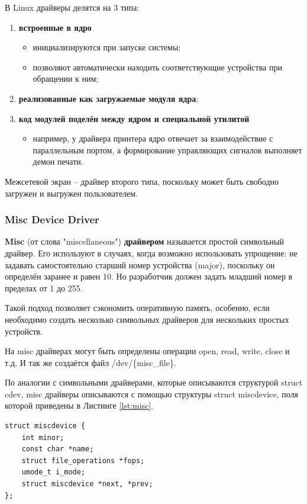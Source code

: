 В Linux драйверы делятся на 3 типа:
\begin{enumerate}
	\item \textbf{встроенные в ядро}
	\begin{itemize}
		\item инициализируются при запуске системы;
		
		\item позволяют автоматически находить соответствующие устройства при обращении к ним;
	\end{itemize}
	
	\item \textbf{реализованные как загружаемые модуля ядра};
	
	\item \textbf{код модулей поделён между ядром и специальной утилитой}
	\begin{itemize}
		\item например, у драйвера принтера ядро отвечает за взаимодействие с параллельным портом, а формирование управляющих сигналов выполняет демон печати.
	\end{itemize}
\end{enumerate}

Межсетевой экран -- драйвер второго типа, поскольку может быть свободно загружен и выгружен пользователем. \newline

\subsubsection{Misc Device Driver}
\textbf{Misc} (от слова "miscellaneous") \textbf{драйвером} называется простой символьный драйвер. Его используют в случаях, когда возможно использовать упрощение: не задавать самостоятельно старший номер устройства (major), поскольку он определён заранее и равен 10. Но разработчик должен задать младший номер в пределах от 1 до 255. \cite{misc}

Такой подход позволяет сэкономить оперативную память, особенно, если необходимо создать несколько символьных драйверов для нескольких простых устройств.

На misc драйверах могут быть определены операции open, read, write, close и т.д. И так же создаётся файл /dev/\{misc\_file\}.

По аналогии с символьными драйверами, которые описываются структурой struct cdev, misc драйверы описываются с помощью структуры struct miscdevice, поля которой приведены в Листинге \ref{lst:misc}.
\begin{lstlisting}[caption = {struct miscdevice}, label=lst:misc]
struct miscdevice {
	int minor;
	const char *name;
	struct file_operations *fops;
	umode_t i_mode;
	struct miscdevice *next, *prev;
};
\end{lstlisting}

